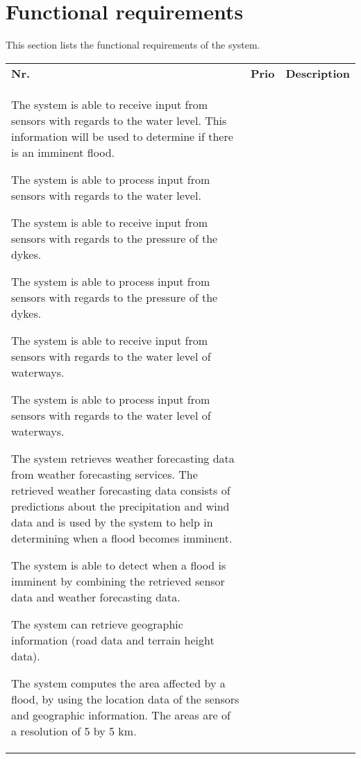 \newpage
\section{Functional requirements}
This section lists the functional requirements of the system.
\begin{longtable}{L{0.1\textwidth} L{0.12\textwidth} L{0.78\textwidth}}

    \textbf{Nr.} & \textbf{Prio}  & \textbf{Description} \\
    
    {The system is able to receive input from sensors with regards to the water level. This information will be used to determine if there is an imminent flood.}
    
    { The system is able to process input from sensors with regards to the water level. }
    
	{The system is able to receive input from sensors with regards to the pressure of the dykes.}
	
	{The system is able to process input from sensors with regards to the pressure of the dykes.}
	
	{The system is able to receive input from sensors with regards to the water level of waterways.}
	
	{The system is able to process input from sensors with regards to the water level of waterways.}

    {The system retrieves weather forecasting data from weather forecasting services. The retrieved weather forecasting data consists of predictions about the precipitation and wind data and is used by the system to help in determining when a flood becomes imminent.}
     
    { The system is able to detect when a flood is imminent by combining the retrieved sensor data and weather forecasting data. }
    
    { The system can retrieve geographic information (road data and terrain height data).}
        
    { The system computes the area affected by a flood, by using the location data of the sensors and geographic information. The areas are of a resolution of 5 by 5 km. }
    

\end{longtable}
